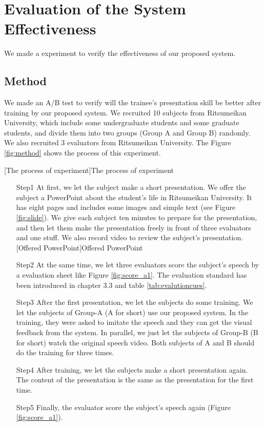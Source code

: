 \newpage

\section{Evaluation of the System Effectiveness}%
\label{sec:evaluation_of_the_system_effectiveness}
\par  We made a experiment to verify the effectiveness of our proposed system.

\subsection*{Method}
\par We made an A/B test to verify will the trainee's presentation skill be better after training by our proposed system. We recruited 10 subjects from Ritsumeikan University, which include some undergraduate students and some graduate students, and divide them into two groups (Group A and Group B) randomly. We also recruited 3 evaluators from Ritsumeikan University. The Figure \ref{fig:method} shows the process of this experiment.       

[The process of experiment]{The process of experiment}
\begin{itemize}
 \item [Step1] At first, we let the subject make a short presentation. We offer the subject a PowerPoint about the student's life in Ritsumeikan University. It has eight pages and includes some images and simple text (see Figure \ref{fig:slide}). We give each subject ten minutes to prepare for the presentation, and then let them make the presentation freely in front of three evaluators and one stuff. We also record video to review the subject's presentation.
  [Offered PowerPoint]{Offered PowerPoint} 
  \item [Step2] At the same time, we let three evaluators score the subject's speech by a evaluation sheet like Figure \ref{fig:score_a1}. The evaluation standard has been introduced in chapter 3.3 and table \ref{tab:evalutioncues}.
  \item [Step3] After the first presentation, we let the subjects do some training. We let the subjects of Group-A (A for short) use our proposed system. In the training, they were asked to imitate the speech and they can get the visual feedback from the system. In parallel, we just let the subjects of Group-B (B for short) watch the original speech video. Both subjects of A and B should do the training for three times.
  \item [Step4] After training, we let the subjects make a short presentation again. The content of the presentation is the same as the presentation for the first time.
  \item [Step5] Finally, the evaluator score the subject's speech again (Figure \ref{fig:score_a1}).
\end{itemize}


